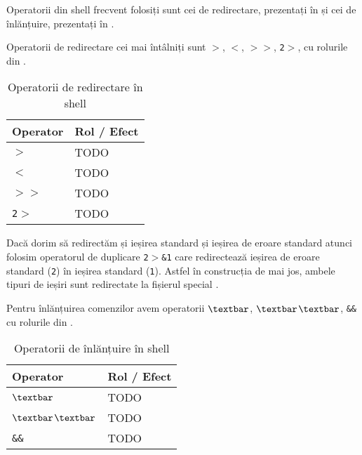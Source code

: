 Operatorii din shell frecvent folosiți sunt cei de redirectare, prezentați în
 și cei de înlănțuire,
prezentați în .

Operatorii de redirectare cei mai întâlniți sunt \texttt{$>$}, \texttt{$<$}, \texttt{$>$$>$}, \texttt{2$>$}, cu rolurile din .

\begin{table}[!htb]
  \caption{Operatorii de redirectare în shell}
  \begin{center}
    \begin{tabular}{ p{} p{} }
      \toprule
        \textbf{Operator} &
        \textbf{Rol / Efect} \\
      \midrule
        \texttt{$>$} &
        TODO \\

        \texttt{$<$} &
        TODO \\

        \texttt{$>$$>$} &
        TODO \\

        \texttt{2$>$} &
        TODO \\
      \bottomrule
    \end{tabular}
    \label{tab:cli:key-bindings}
  \end{center}
\end{table}

Dacă dorim să redirectăm și ieșirea standard și ieșirea de eroare standard
atunci folosim operatorul de duplicare \texttt{2$>$\&1} care redirectează ieșirea de eroare
standard (\texttt{2}) în ieșirea standard (\texttt{1}). Astfel în construcția de mai jos, ambele
tipuri de ieșiri sunt redirectate la fișierul special .

Pentru înlănțuirea comenzilor avem operatorii \texttt{$\textbar$}, \texttt{$\textbar$$\textbar$}, \texttt{\&\&} cu rolurile din .

\begin{table}[!htb]
  \caption{Operatorii de înlănțuire în shell}
  \begin{center}
    \begin{tabular}{ p{} p{} }
      \toprule
        \textbf{Operator} &
        \textbf{Rol / Efect} \\
      \midrule
        \texttt{$\textbar$} &
        TODO \\

        \texttt{$\textbar$$\textbar$} &
        TODO \\

        \texttt{\&\&} &
        TODO \\

      \bottomrule
    \end{tabular}
    \label{tab:cli:key-bindings}
  \end{center}
\end{table}

